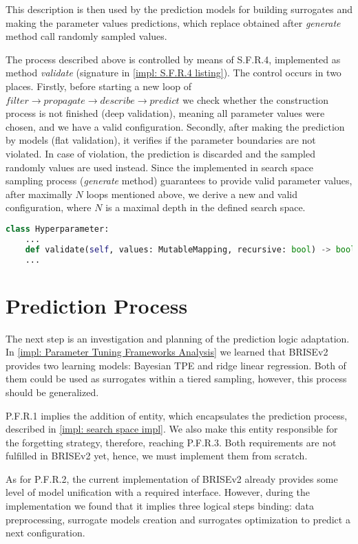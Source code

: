 This description is then used by the prediction models for building surrogates and making the parameter values predictions, which replace obtained after \emph{generate} method call randomly sampled values.

The process described above is controlled by means of S.F.R.4, implemented as method \emph{validate} (signature in \cref{impl: S.F.R.4 listing}). The control occurs in two places. Firstly, before starting a new loop of $filter \rightarrow propagate \rightarrow describe \rightarrow predict$ we check whether the construction process is not finished (deep validation), meaning all parameter values were chosen, and we have a valid configuration. Secondly, after making the prediction by models (flat validation), it verifies if the parameter boundaries are not violated. In case of violation, the prediction is discarded and the sampled randomly values are used instead. Since the implemented in search space sampling process (\emph{generate} method) guarantees to provide valid parameter values, after maximally $N$ loops mentioned above, we derive a new and valid configuration, where $N$ is a maximal depth in the defined search space.

\begin{lstlisting}[language=Python, caption=S.F.R.4 implementation., label=impl: S.F.R.4 listing]
class Hyperparameter:
	...
	def validate(self, values: MutableMapping, recursive: bool) -> bool
	...
\end{lstlisting}


\section{Prediction Process}\label{impl: prediction logic}
The next step is an investigation and planning of the prediction logic adaptation.
In \cref{impl: Parameter Tuning Frameworks Analysis} we learned that BRISEv2 provides two learning models: Bayesian TPE and ridge linear regression. Both of them could be used as surrogates within a tiered sampling, however, this process should be generalized.

P.F.R.1 implies the addition of entity, which encapsulates the prediction process, described in \cref{impl: search space impl}. We also make this entity responsible for the forgetting strategy, therefore, reaching P.F.R.3. Both requirements are not fulfilled in BRISEv2 yet, hence, we must implement them from scratch.

As for P.F.R.2, the current implementation of BRISEv2 already provides some level of model unification with a required interface. However, during the implementation we found that it implies three logical steps binding: data preprocessing, surrogate models creation and surrogates optimization to predict a next configuration.

